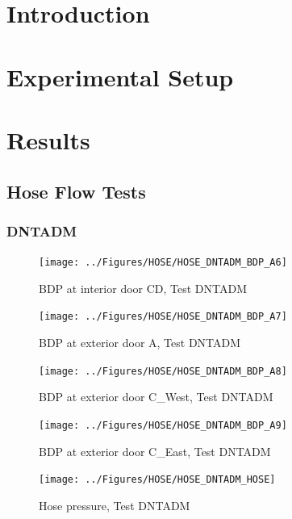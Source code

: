 \documentclass[11pt,oneside]{book}
\begin{document}
\mainmatter

\chapter{Introduction}
\label{chap:Introduction}

\chapter{Experimental Setup}
\label{chap:Experimental_Setup}

\chapter{Results}
\label{chap:Results}

\section{Hose Flow Tests}

\subsection{DNTADM}

\begin{figure}[!ht]
\texttt{[image: ../Figures/HOSE/HOSE\_DNTADM\_BDP\_A6]}
\caption{BDP at interior door CD, Test DNTADM}
\label{fig:HOSE_DNTADM_BDP_A6}
\end{figure}

\begin{figure}[!ht]
\texttt{[image: ../Figures/HOSE/HOSE\_DNTADM\_BDP\_A7]}
\caption{BDP at exterior door A, Test DNTADM}
\label{fig:HOSE_DNTADM_BDP_A7}
\end{figure}

\begin{figure}[!ht]
\texttt{[image: ../Figures/HOSE/HOSE\_DNTADM\_BDP\_A8]}
\caption{BDP at exterior door C\_West, Test DNTADM}
\label{fig:HOSE_DNTADM_BDP_A8}
\end{figure}

\begin{figure}[!ht]
\texttt{[image: ../Figures/HOSE/HOSE\_DNTADM\_BDP\_A9]}
\caption{BDP at exterior door C\_East, Test DNTADM}
\label{fig:HOSE_DNTADM_BDP_A9}
\end{figure}

\begin{figure}[!ht]
\texttt{[image: ../Figures/HOSE/HOSE\_DNTADM\_HOSE]}
\caption{Hose pressure, Test DNTADM}
\label{fig:HOSE_DNTADM_HOSE}
\end{figure}
\end{document}
